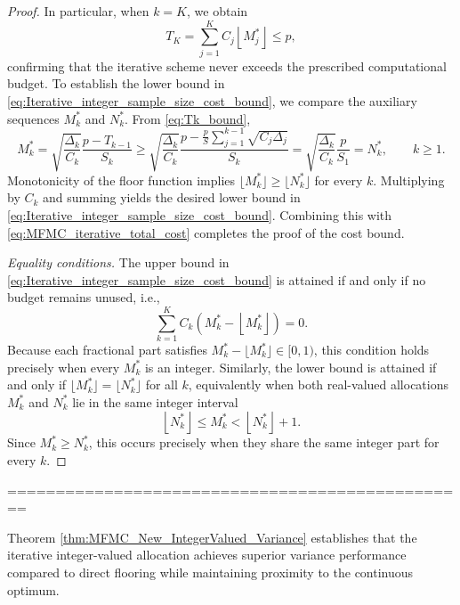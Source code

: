 \begin{proof}
In particular, when $k=K$, we obtain
\begin{equation}\label{eq:MFMC_iterative_total_cost}
T_K = \sum_{j=1}^K C_j\left\lfloor M_j^*\right\rfloor \le p,
\end{equation}
confirming that the iterative scheme never exceeds the prescribed computational budget. To establish the lower bound in \eqref{eq:Iterative_integer_sample_size_cost_bound}, we compare the auxiliary sequences $M_k^*$ and $N_k^*$. From \eqref{eq:Tk_bound},
%
\[
M_k^* = \sqrt{\frac{\Delta_k}{C_k}}\frac{p - T_{k-1}}{S_k} \ge \sqrt{\frac{\Delta_k}{C_k}}\frac{p-\frac{p}{S}\sum_{j=1}^{k-1}\sqrt{C_j\Delta_j}}{S_k} = \sqrt{\frac{\Delta_k}{C_k}}\frac{p}{S_1}=N_k^*, \qquad k \ge 1.
\]
% 
Monotonicity of the floor function implies \(\lfloor M_k^*\rfloor\ge\lfloor N_k^*\rfloor\) for every \(k\). Multiplying by \(C_k\) and summing yields the desired lower bound in 
\eqref{eq:Iterative_integer_sample_size_cost_bound}.  
Combining this with \eqref{eq:MFMC_iterative_total_cost} completes the proof of the cost bound.


\medskip
\noindent
\textit{ Equality conditions.}
The upper bound in \eqref{eq:Iterative_integer_sample_size_cost_bound} is attained if and only if no budget remains unused, i.e.,
\[
\sum_{k=1}^K C_k \left(M_k^* - \left\lfloor M_k^*\right\rfloor\right) = 0.
\]
Because each fractional part satisfies $M_k^* - \lfloor M_k^* \rfloor \in [0,1)$, this condition holds precisely when every $M_k^*$ is an integer. Similarly, the lower bound is attained if and only if \(\lfloor M_k^* \rfloor = \lfloor N_k^* \rfloor\) for all \(k\), equivalently when both real-valued allocations \(M_k^*\) and \(N_k^*\) lie in the same integer interval
%
\[
\left\lfloor N_k^*\right\rfloor\le M_k^* < \left\lfloor N_k^*\right\rfloor + 1.
\]
Since \(M_k^* \ge N_k^*\), this occurs precisely when they share the same integer part for every \(k\).

\end{proof}

================================================

Theorem \ref{thm:MFMC_New_IntegerValued_Variance} establishes that the iterative integer-valued allocation achieves superior variance performance compared to direct flooring while maintaining proximity to the continuous optimum.


